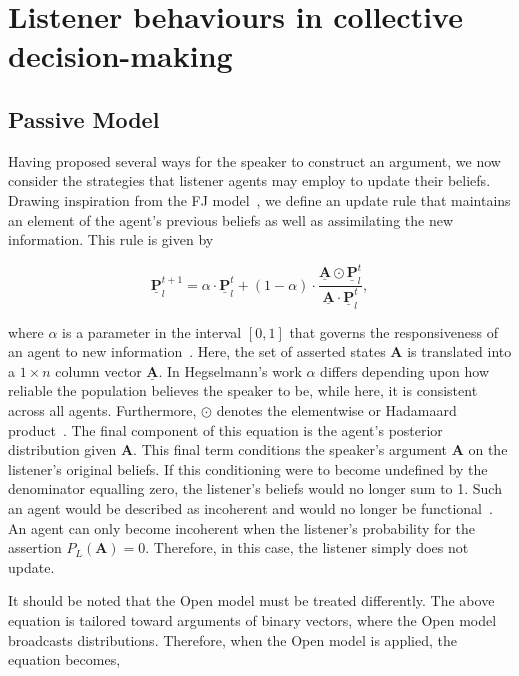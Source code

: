 \section{Listener behaviours in collective decision-making} \label{sect:listener_models}

\subsection*{Passive Model}
Having proposed several ways for the speaker to construct an argument, we now consider the strategies that listener agents may employ to update their beliefs. Drawing inspiration from the FJ model~\cite{Friedkin1999SocialChange}, we define an update rule that maintains an element of the agent's previous beliefs as well as assimilating the new information. This rule is given by

\begin{equation} \label{eq:BU_update_rule}
    \underline{\mathbf{P}}^{t+1}_l = \alpha \cdot \underline{\mathbf{P}}^{t}_l + (1 - \alpha) \cdot  \frac{\underline{\mathbf{A}} \odot \underline{\mathbf{P}}^t_l}{\underline{\mathbf{A}} \cdot \underline{\mathbf{P}}^t_l},
\end{equation}

where $\alpha$ is a parameter in the interval $[0, 1]$ that governs the responsiveness of an agent to new information~\cite{Hegselmann2002OpinionSimulation}. Here, the set of asserted states $\mathbf{A}$ is translated into a $1 \times n$ column vector $\underline{\mathbf{A}}$. In Hegselmann's work $\alpha$ differs depending upon how reliable the population believes the speaker to be, while here, it is consistent across all agents. Furthermore, $\odot$ denotes the elementwise or Hadamaard product~\cite{Johnson1990MatrixApplications}. The final component of this equation is the agent's posterior distribution given $\mathbf{A}$. This final term conditions the speaker's argument $\mathbf{A}$ on the listener's original beliefs. If this conditioning were to become undefined by the denominator equalling zero, the listener's beliefs would no longer sum to 1. Such an agent would be described as incoherent and would no longer be functional~\cite{Lee2018CombiningConsensus}. An agent can only become incoherent when the listener's probability for the assertion $P_L(\mathbf{A}) = 0$. Therefore, in this case, the listener simply does not update.

It should be noted that the Open model must be treated differently. The above equation is tailored toward arguments of binary vectors, where the Open model broadcasts distributions. Therefore, when the Open model is applied, the equation becomes,

